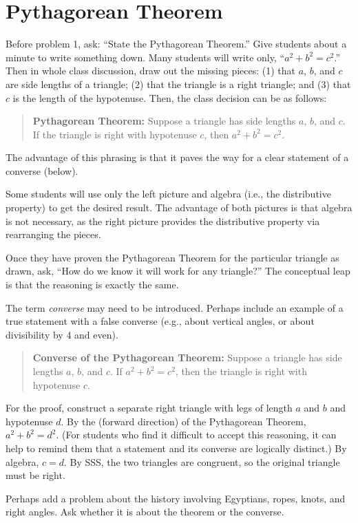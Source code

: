 \newpage

\section{Pythagorean Theorem}

\begin{teachingnote}
Before problem 1, ask:  ``State the Pythagorean Theorem.''  Give students about a minute to write something down.  Many students will write only, ``$a^2 + b^2 = c^2$.''  Then in whole class discussion, draw out the missing pieces:  (1) that $a$, $b$, and $c$ are side lengths of a triangle;  (2) that the triangle is a right triangle; and (3) that $c$ is the length of the hypotenuse.  Then, the class decision can be as follows: 
 
\begin{quote}\textbf{Pythagorean Theorem:}  Suppose a triangle has side lengths $a$, $b$, and $c$.  If the triangle is right with hypotenuse $c$, then $a^2 + b^2 = c^2$. 
\end{quote}
The advantage of this phrasing is that it paves the way for a clear statement of a converse (below).   

Some students will use only the left picture and algebra (i.e., the distributive property) to get the desired result.  The advantage of both pictures is that algebra is not necessary, as the right picture provides the distributive property via rearranging the pieces.  

Once they have proven the Pythagorean Theorem for the particular triangle as drawn, ask, ``How do we know it will work for any triangle?''  The conceptual leap is that the reasoning is exactly the same.  

The term \emph{converse} may need to be introduced.  Perhaps include an example of a true statement with a false converse (e.g., about vertical angles, or about divisibility by 4 and even).  

\begin{quote}
\textbf{Converse of the Pythagorean Theorem:}  Suppose a triangle has side lengths $a$, $b$, and $c$.  If $a^2 + b^2 = c^2$, then the triangle is right with hypotenuse $c$. 
\end{quote}

For the proof, construct a separate right triangle with legs of length $a$ and $b$ and hypotenuse $d$.  By the (forward direction) of the Pythagorean Theorem, $a^2+b^2=d^2$.  (For students who find it difficult to accept this reasoning, it can help to remind them that a statement and its converse are logically distinct.)  By algebra, $c=d$.  By SSS, the two triangles are congruent, so the original triangle must be right.  

Perhaps add a problem about the history involving Egyptians, ropes, knots, and right angles.  Ask whether it is about the theorem or the converse. 
\end{teachingnote}


